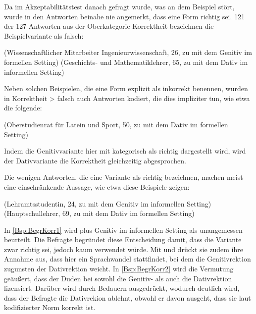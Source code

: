 Da im Akzeptabilitätstest danach gefragt wurde, was an dem Beispiel stört, wurde in den Antworten beinahe nie angemerkt, dass eine Form richtig sei. 
121 der 127 Antworten aus der Oberkategorie \glqq Korrektheit\grqq{} bezeichnen die Beispielvariante als falsch: 
\begin{exe}
\ex {} (Wissenschaftlicher Mitarbeiter Ingenieurwissenschaft, 26, zu \gegenueber{} mit dem Genitiv im formellen Setting) 
\ex {} (Geschichts- und Mathematiklehrer, 65, zu \waehrend{} mit dem Dativ im informellen Setting) 
\end{exe}
Neben solchen Beispielen, die eine Form explizit als inkorrekt benennen, wurden in \glqq Korrektheit > falsch\grqq{} auch Antworten kodiert, die dies impliziter tun, wie etwa die folgende:
\begin{exe}
\ex {} (Oberstudienrat für Latein und Sport, 50, zu \waehrend{} mit dem Dativ im formellen Setting) 
\end{exe}
Indem die Genitivvariante hier mit  kategorisch als richtig dargestellt wird, wird der Dativvariante die Korrektheit gleichzeitig abgesprochen. 

\begin{sloppypar}
Die wenigen Antworten, die eine Variante als richtig bezeichnen, machen meist eine einschränkende Aussage, wie etwa diese Beispiele zeigen: 
\end{sloppypar}

\begin{exe}
\ex {} (Lehramtsstudentin, 24, zu \dank{} mit dem Genitiv im informellen Setting) \label{Bsp:BegrKorr1}
\ex {} (Hauptschullehrer, 69, zu \wegen{} mit dem Dativ im formellen Setting) \label{Bsp:BegrKorr2}
\end{exe}
In \autoref{Bsp:BegrKorr1} wird \dank{} plus Genitiv im informellen Setting als unangemessen beurteilt. 
Die Befragte begründet diese Entscheidung damit, dass die Variante zwar richtig sei, jedoch kaum verwendet würde. 
Mit  und  drückt sie zudem ihre Annahme aus, dass hier ein Sprachwandel stattfindet, bei dem die Genitivrektion zugunsten der Dativrektion weicht. 
In \autoref{Bsp:BegrKorr2} wird die Vermutung geäußert, dass der Duden bei \wegen{} sowohl die Genitiv- als auch die Dativrektion lizensiert. 
Darüber wird durch  Bedauern ausgedrückt, wodurch deutlich wird, dass der Befragte die Dativrekion ablehnt, obwohl er davon ausgeht, dass sie laut kodifizierter Norm korrekt ist. 

